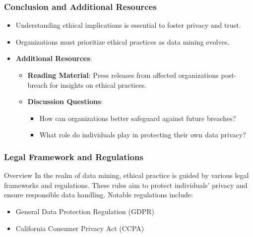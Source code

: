 \documentclass{beamer}
\begin{document}
\begin{frame}[fragile]
    \frametitle{Conclusion and Additional Resources}
    \begin{itemize}
        \item Understanding ethical implications is essential to foster privacy and trust.
        \item Organizations must prioritize ethical practices as data mining evolves.
        
        \item \textbf{Additional Resources}:
        \begin{itemize}
            \item \textbf{Reading Material}: Press releases from affected organizations post-breach for insights on ethical practices.
            \item \textbf{Discussion Questions}:
            \begin{itemize}
                \item How can organizations better safeguard against future breaches?
                \item What role do individuals play in protecting their own data privacy?
            \end{itemize}
        \end{itemize}
    \end{itemize}
\end{frame}

\begin{frame}[fragile]
    \frametitle{Legal Framework and Regulations}
    
    \begin{block}{Overview}
        In the realm of data mining, ethical practice is guided by various legal frameworks and regulations. 
        These rules aim to protect individuals' privacy and ensure responsible data handling. Notable regulations include:
        \begin{itemize}
            \item General Data Protection Regulation (GDPR)
            \item California Consumer Privacy Act (CCPA)
        \end{itemize}
    \end{block}
\end{frame}
\end{document}
